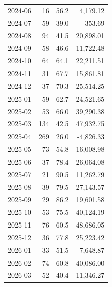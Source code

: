 \documentclass[11pt,a4paper,twoside]{article}
\begin{document}
\begin{center}
\begin{tabular}{>{\color{txtmain}}l rrr}
2024-06 & 16 & 56.2 & \textcolor{wingreen}{4,179.12} \\
2024-07 & 59 & 39.0 & \textcolor{wingreen}{353.69} \\
2024-08 & 94 & 41.5 & \textcolor{wingreen}{20,898.01} \\
2024-09 & 58 & 46.6 & \textcolor{wingreen}{11,722.48} \\
2024-10 & 64 & 64.1 & \textcolor{wingreen}{22,211.51} \\
2024-11 & 31 & 67.7 & \textcolor{wingreen}{15,861.81} \\
2024-12 & 37 & 70.3 & \textcolor{wingreen}{25,514.25} \\
2025-01 & 59 & 62.7 & \textcolor{wingreen}{24,521.65} \\
2025-02 & 53 & 66.0 & \textcolor{wingreen}{39,290.38} \\
2025-03 & 134 & 42.5 & \textcolor{wingreen}{47,932.75} \\
2025-04 & 269 & 26.0 & \textcolor{lossred}{-4,826.33} \\
2025-05 & 73 & 54.8 & \textcolor{wingreen}{16,008.98} \\
2025-06 & 37 & 78.4 & \textcolor{wingreen}{26,064.08} \\
2025-07 & 21 & 90.5 & \textcolor{wingreen}{11,262.79} \\
2025-08 & 39 & 79.5 & \textcolor{wingreen}{27,143.57} \\
2025-09 & 29 & 86.2 & \textcolor{wingreen}{19,601.58} \\
2025-10 & 53 & 75.5 & \textcolor{wingreen}{40,124.19} \\
2025-11 & 76 & 60.5 & \textcolor{wingreen}{48,686.05} \\
2025-12 & 36 & 77.8 & \textcolor{wingreen}{25,223.42} \\
2026-01 & 33 & 51.5 & \textcolor{wingreen}{7,648.87} \\
2026-02 & 74 & 60.8 & \textcolor{wingreen}{40,086.00} \\
2026-03 & 52 & 40.4 & \textcolor{wingreen}{11,346.27} \\
\bottomrule
\end{tabular}
\end{center}
\end{document}
